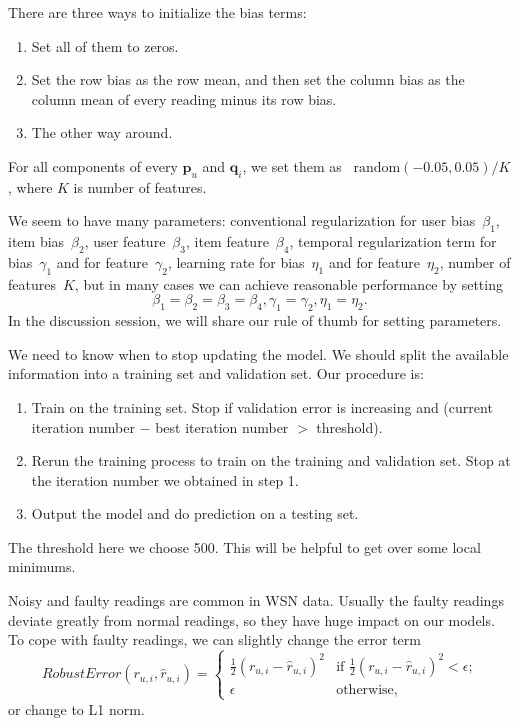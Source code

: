 
There are three ways to initialize the bias terms:
\begin{enumerate}
	\setlength {\itemsep}{-5pt}
	\item Set all of them to zeros.
	\item Set the row bias as the row mean, and then set the column bias as the column mean of every reading minus its row bias.
	\item The other way around.
\end{enumerate}
For all components of every $\mathbf{p}_{u}$ and $\mathbf{q}_{i}$, we set them as ~$\mbox{random}(-0.05,0.05)/K$, where $K$ is number of features.


We seem to have many parameters: conventional regularization for user bias~$\beta_1$, item bias~$\beta_2$, user feature~$\beta_3$, item feature~$\beta_4$, temporal regularization term for bias~$\gamma_1$ and for feature~$\gamma_2$, learning rate for bias~$\eta_1$ and for feature~$\eta_2$, number of features~$K$, but in many cases we can achieve reasonable performance by setting 
\begin{equation*}\beta_1 = \beta_2 = \beta_3 = \beta_4, \gamma_1 = \gamma_2, \eta_1 = \eta_2. \end{equation*}
In the discussion session, we will share our rule of thumb for setting parameters.


We need to know when to stop updating the model. We should split the available information into a training set and validation set. Our procedure is:
\begin{enumerate}
	\item Train on the training set. Stop if validation error is increasing and (current iteration number $-$ best iteration number $>$ threshold).  
	\item Rerun the training process to train on the training and validation set. Stop at the iteration number we obtained in step 1.
	\item Output the model and do prediction on a testing set. 
\end{enumerate}
The threshold here we choose 500. This will be helpful to get over some local minimums.


Noisy and faulty readings are common in WSN data. Usually the faulty readings deviate greatly from normal readings, so they have huge impact on our models. To cope with faulty readings, we can slightly change the error term
\begin{equation*}RobustError(r_{u,i}, \hat{r}_{u,i}) = 
\begin{cases}
	\frac{1}{2}(r_{u,i}-\hat{r}_{u,i})^2 & \mbox{if $\frac{1}{2}(r_{u,i}-\hat{r}_{u,i})^2 < \epsilon$;}\\
	\epsilon & \mbox{otherwise},
\end{cases}
\end{equation*}
or change to L1 norm.

